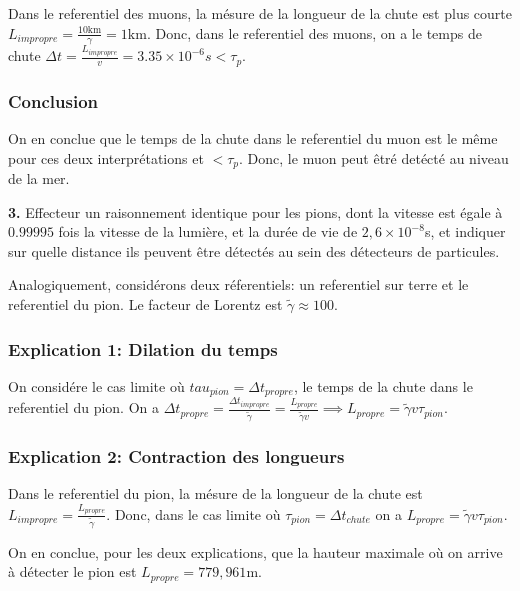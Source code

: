 \documentclass[french]{article}
\begin{document}
	Dans le referentiel des muons, la mésure de la longueur de la chute est plus courte $L_{impropre} = \frac{10 \mathrm{km}}{\gamma} = 1 \mathrm{km}$.	Donc, dans le referentiel des muons, on a le temps de chute $\Delta t = \frac{L_{impropre}}{v} = 3.35 \times 10^{-6}s < \tau_p$.
	
	\subsubsection*{Conclusion}
	
	On en conclue que le temps de la chute dans le referentiel du muon est le même pour ces deux interprétations et $< \tau_p$. Donc, le muon peut êtré detécté au niveau de la mer.

	\begin{tcolorbox}[colback=gray!5!white,colframe=gray!75!black]
		\textbf{3.} Effecteur un raisonnement identique pour les pions, dont la vitesse est égale à $0.99995$ fois la vitesse de la lumière, et la durée de vie de $2,6 \times 10^{-8}$s, et indiquer sur quelle distance ils peuvent être détectés au sein des détecteurs de particules.
	\end{tcolorbox}

	Analogiquement, considérons deux réferentiels: un referentiel sur terre et le referentiel du pion. Le facteur de Lorentz est $\tilde{\gamma} \approx 100$. 
	
	\subsubsection*{Explication 1: Dilation du temps}
	
	On considére le cas limite où $tau_{pion} = \Delta t_{propre}$, le temps de la chute dans le referentiel du pion. On a $\Delta t_{propre} = \frac{\Delta t_{impropre}}{\tilde{\gamma}} = \frac{L_{propre}}{\tilde{\gamma}v} \implies L_{propre} = \tilde{\gamma}v\tau_{pion}$.
	
	\subsubsection*{Explication 2: Contraction des longueurs}
	
	Dans le referentiel du pion, la mésure de la longueur de la chute est $L_{impropre} = \frac{L_{propre}}{\tilde{\gamma}}$.	Donc, dans le cas limite où $\tau_{pion} = \Delta t_{chute}$ on a $L_{propre} = \tilde{\gamma}v\tau_{pion}$.
	
	On en conclue, pour les deux explications, que la hauteur maximale où on arrive à détecter le pion est $L_{propre} = 779,961\mathrm{m}$.
	
	
\end{document}
